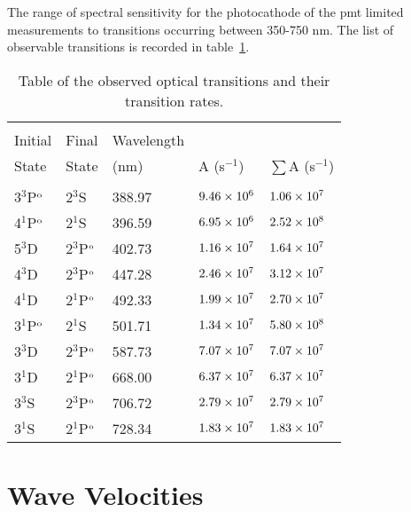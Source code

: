 The range of spectral sensitivity for the photocathode of the \acs{pmt} limited
measurements to transitions occurring between 350-750 nm. The list of observable
transitions is recorded in table~\ref{tbl:transitions}.
\begin{table}
  \centering
  \caption{Table of the observed optical transitions and their transition
    rates.}
  \begin{tabular}{lllll}
    \toprule                                                                    \\
    Initial      & Final        & Wavelength &              &                   \\
    State        & State        & (nm)       & A (s$^{-1}$) & $\sum$A (s$^{-1}$)\\
    \midrule                                                                    \\
    3$^3$P$^\mathrm{o}$ & 2$^3$S       & 388.97     & $9.46\times10^6$   & $1.06\times10^7$        \\
    4$^1$P$^\mathrm{o}$ & 2$^1$S       & 396.59     & $6.95\times10^6$   & $2.52\times10^8$        \\
    5$^3$D       & 2$^3$P$^\mathrm{o}$ & 402.73     & $1.16\times10^7$   & $1.64\times10^7$        \\
    4$^3$D       & 2$^3$P$^\mathrm{o}$ & 447.28     & $2.46\times10^7$   & $3.12\times10^7$        \\
    4$^1$D       & 2$^1$P$^\mathrm{o}$ & 492.33     & $1.99\times10^7$   & $2.70\times10^7$        \\
    3$^1$P$^\mathrm{o}$ & 2$^1$S       & 501.71     & $1.34\times10^7$   & $5.80\times10^8$        \\
    3$^3$D       & 2$^3$P$^\mathrm{o}$ & 587.73     & $7.07\times10^7$   & $7.07\times10^7$        \\
    3$^1$D       & 2$^1$P$^\mathrm{o}$ & 668.00     & $6.37\times10^7$   & $6.37\times10^7$        \\
    3$^3$S       & 2$^3$P$^\mathrm{o}$ & 706.72     & $2.79\times10^7$   & $2.79\times10^7$        \\
    3$^1$S       & 2$^1$P$^\mathrm{o}$ & 728.34     & $1.83\times10^7$   & $1.83\times10^7$        \\
  \end{tabular}
  \label{tbl:transitions}
\end{table}


\section{Wave Velocities}

